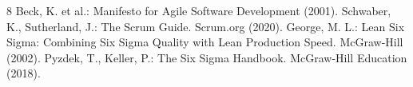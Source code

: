 \documentclass[runningheads]{llncs}
\begin{document}
\begin{thebibliography}{8}
Beck, K. et al.: Manifesto for Agile Software Development (2001).
Schwaber, K., Sutherland, J.: The Scrum Guide. Scrum.org (2020).
George, M. L.: Lean Six Sigma: Combining Six Sigma Quality with Lean Production Speed. McGraw-Hill (2002).
Pyzdek, T., Keller, P.: The Six Sigma Handbook. McGraw-Hill Education (2018).
\end{thebibliography}
\end{document}
